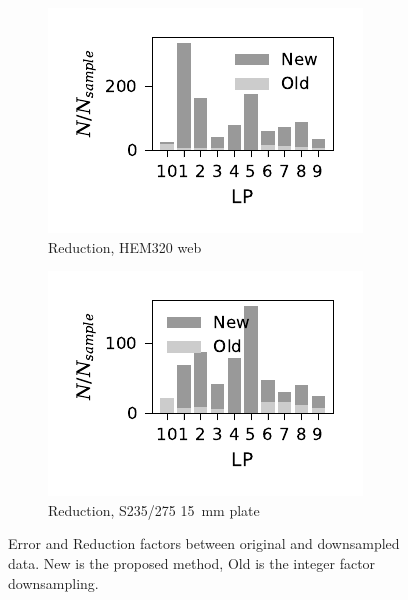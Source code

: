 \documentclass[a4paper,11pt]{article}
\begin{document}
\begin{figure}
    \begin{subfigure}[b]{0.45\linewidth}
        \centering
        \includegraphics{N_reduction_WP3_HEM320_C_CRM20.pdf}
        \caption{Reduction, HEM320 web}
        \label{fig:hem320-reduction}
    \end{subfigure}
    \begin{subfigure}[b]{0.45\linewidth}
        \centering
        \includegraphics{N_reduction_S235275_Plate15.pdf}
        \caption{Reduction, S235/275 15~mm plate}
        \label{fig:s235275-reduction}
    \end{subfigure}
    \caption{Error and Reduction factors between original and downsampled data. New is the proposed method, Old is the integer factor downsampling.}
    \label{fig:error-and-reduction}
\end{figure}
\end{document}
